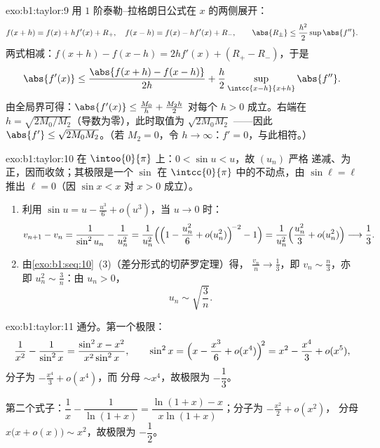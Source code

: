 \begin{solution}{exo:b1:taylor:9}
用 $1$ 阶泰勒–拉格朗日公式在 $x$ 的两侧展开：
\[
f(x + h) = f(x) + h f'(x) + R_+,\quad
f(x - h) = f(x) - h f'(x) + R_-,
\qquad \abs{R_\pm} \leq \frac{h^2}{2} \sup \abs{f''} .
\]
两式相减：$f(x+h) - f(x-h) = 2h f'(x) + (R_+ - R_-)$，于是
\[
\abs{f'(x)} \leq \frac{\abs{f(x+h) - f(x-h)}}{2h} +
\frac{h}{2}\sup_{\intcc{x-h}{x+h}}\abs{f''} .
\]
由全局界可得：$\abs{f'(x)} \leq \frac{M_0}{h} + \frac{M_2
h}{2}$ 对每个 $h > 0$ 成立。右端在 $h =
\sqrt{2M_0/M_2}$（导数为零），此时取值为 $\sqrt{2M_0M_2}$
——因此 $\abs{f'} \leq \sqrt{2M_0M_2}$。（若 $M_2 = 0$，令 $h \to
\infty$：$f' = 0$，与此相符。）
\end{solution}

\begin{solution}{exo:b1:taylor:10}
在 $\intoo{0}{\pi}$ 上：$0 < \sin u < u$，故 $(u_n)$ 严格
递减、为正，因而收敛；其极限是一个
$\sin$ 在 $\intcc{0}{\pi}$ 中的不动点，由 $\sin \ell = \ell$ 推出 $\ell =
0$（因 $\sin x < x$ 对 $x > 0$ 成立）。
\begin{enumerate}
  \item 利用 $\sin u = u - \frac{u^3}{6} + o(u^3)$，当 $u \to 0$ 时：
        \[
        v_{n+1} - v_n = \frac{1}{\sin^2 u_n} - \frac{1}{u_n^2}
        = \frac{1}{u_n^2}\Bigl(\Bigl(1 - \frac{u_n^2}{6} +
        o(u_n^2)\Bigr)^{\!-2} - 1\Bigr)
        = \frac{1}{u_n^2}\Bigl(\frac{u_n^2}{3} + o(u_n^2)\Bigr)
        \longrightarrow \frac13 .
        \]
  \item 由\cref{exo:b1:seq:10}~(3)（差分形式的切萨罗定理）得，
        $\frac{v_n}{n} \to \frac13$，即 $v_n \sim \frac n3$，亦即
        $u_n^2 \sim \frac 3n$：由 $u_n > 0$，
        \[
        u_n \sim \sqrt{\frac{3}{n}} .
        \]
\end{enumerate}
\end{solution}

\begin{solution}{exo:b1:taylor:11}
通分。第一个极限：
\[
\frac{1}{x^2} - \frac{1}{\sin^2 x}
= \frac{\sin^2 x - x^2}{x^2\sin^2 x},
\qquad
\sin^2 x = \Bigl(x - \frac{x^3}{6} + o(x^4)\Bigr)^{\!2}
= x^2 - \frac{x^4}{3} + o(x^5) ,
\]
分子为 $-\frac{x^4}{3} + o(x^4)$，而
分母 $\sim x^4$，故极限为 $-\dfrac13$。

第二个式子：$\dfrac1x - \dfrac{1}{\ln(1+x)} = \dfrac{\ln(1+x) -
x}{x\ln(1+x)}$；分子为 $-\frac{x^2}{2} + o(x^2)$，
分母 $x\bigl(x + o(x)\bigr) \sim x^2$，故极限为
$-\dfrac12$。
\end{solution}


